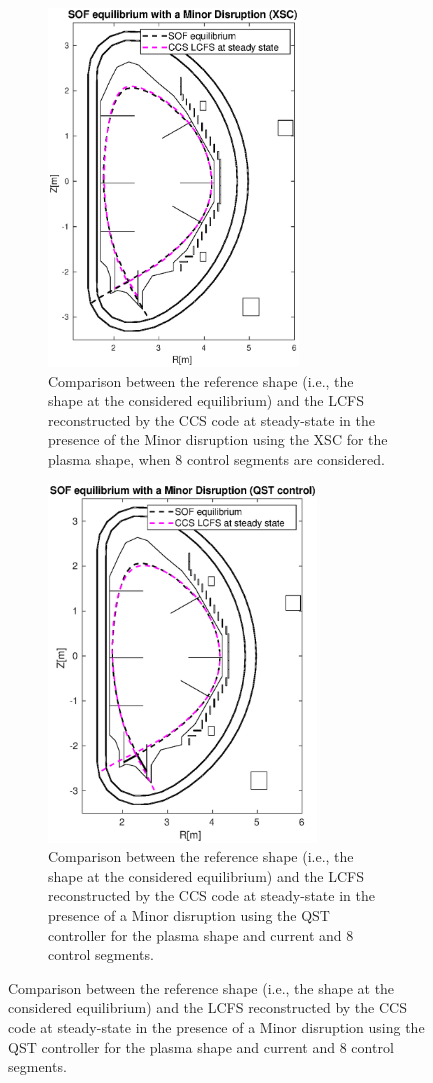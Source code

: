 \begin{figure}[h]
	\centering
		\begin{subfigure}[b]{0.4\textwidth}
		\includegraphics[trim={3cm 0cm 0cm 0cm},clip,height=9.5cm] {Chp3/Results_iso/8_gaps_mnr_disrp_equilVsLCFS.eps}  
		\caption{Comparison between the reference shape (i.e., the shape at the considered equilibrium) and the LCFS reconstructed by the  CCS code at steady-state in the presence of the Minor disruption  using the XSC for the plasma shape, when 8 control segments are considered.
		\label{XSC_isoflux_ss} }
			\end{subfigure}
	\hspace{2 cm}
				\begin{subfigure}[b]{0.4\textwidth}
			\includegraphics[trim={3cm 0cm 0cm 0cm},clip,height=9.5cm] {Chp3/Results_iso/8_gaps_mnr_disrp_equilVsLCFS_FBC.eps}  
			\caption{Comparison between the reference shape (i.e., the shape at the considered equilibrium) and the LCFS reconstructed by the CCS code at steady-state in the presence of a Minor disruption using the QST controller for the plasma shape and current and 8 control segments. 
				\label{FBS_isoflux_ss} }
		\end{subfigure}
		


\end{figure}
